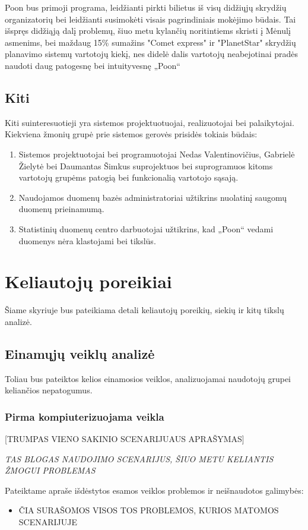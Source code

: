 \documentclass{VUMIFPSkursinis}
\begin{document}
Poon bus primoji programa, leidžianti pirkti bilietus iš visų didžiųjų skrydžių organizatorių bei leidžianti susimokėti visais pagrindiniais mokėjimo būdais. Tai išspręs didžiąją dalį problemų, šiuo metu kylančių noritintiems skristi į Mėnulį asmenims, bei maždaug 15\% sumažins "Comet express" ir "PlanetStar" skrydžių planavimo sistemų vartotojų kiekį, nes didelė dalis vartotojų neabejotinai pradės naudoti daug patogesnę bei intuityvesnę „Poon“

\subsection{Kiti}
Kiti suinteresuotieji yra sistemos projektuotuojai, realizuotojai bei palaikytojai. Kiekviena žmonių grupė prie sistemos gerovės prisidės tokiais būdais:
\begin{enumerate}
\item Sistemos projektuotojai bei programuotojai Nedas Valentinovičius, Gabrielė Žielytė bei Daumantas Šimkus suprojektuos bei suprogramuos kitoms vartotojų grupėms patogią bei funkcionalią vartotojo sąsają.
\item Naudojamos duomenų bazės administratoriai užtikrins nuolatinį saugomų duomenų prieinamumą.
\item Statistinių duomenų centro darbuotojai užtikrins, kad „Poon“ vedami duomenys nėra klastojami bei tikslūs.
\end{enumerate}

\section{Keliautojų poreikiai}
Šiame skyriuje bus pateikiama detali keliautojų poreikių, siekių ir kitų tikslų analizė.

\subsection{Einamųjų veiklų analizė}
Toliau bus pateiktos kelios einamosios veiklos, analizuojamai naudotojų grupei keliančios nepatogumus.

\subsubsection{Pirma kompiuterizuojama veikla}
[TRUMPAS VIENO SAKINIO SCENARIJUAUS APRAŠYMAS]

\textit{TAS BLOGAS NAUDOJIMO SCENARIJUS, ŠIUO METU KELIANTIS ŽMOGUI PROBLEMAS}

Pateiktame apraše išdėstytos esamos veiklos problemos ir neišnaudotos galimybės:  
\begin{itemize}
\item ČIA SURAŠOMOS VISOS TOS PROBLEMOS, KURIOS MATOMOS SCENARIJUJE
\end{itemize}
\end{document}
